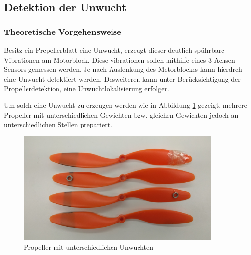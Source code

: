 \subsection{Detektion der Unwucht}

\subsubsection*{Theoretische Vorgehensweise}
Besitz ein Prepellerblatt eine Unwucht, erzeugt dieser deutlich spührbare Vibrationen am Motorblock.
Diese vibrationen sollen mithilfe eines 3-Achsen Sensors gemessen werden.
Je nach Auslenkung des Motorblockes kann hierdrch eine Unwucht detektiert werden.
Desweiteren kann unter Berücksichtigung der Propellerdetektion, eine Unwuchtlokalisierung erfolgen. 

Um solch eine Unwucht zu erzeugen werden wie in Abbildung \ref{fig:propeller-mit-unwucht} gezeigt, mehrere Propeller mit unterschiedlichen Gewichten bzw. gleichen Gewichten jedoch an unterschiedlichen Stellen prepariert.
\begin{figure}[H]
	\centering
	\includegraphics[width=0.9\textwidth]{images/chapter/03/propeller-mit-unwucht.png}
	\caption{Propeller mit unterschiedlichen Unwuchten}
	\label{fig:propeller-mit-unwucht}
\end{figure}

